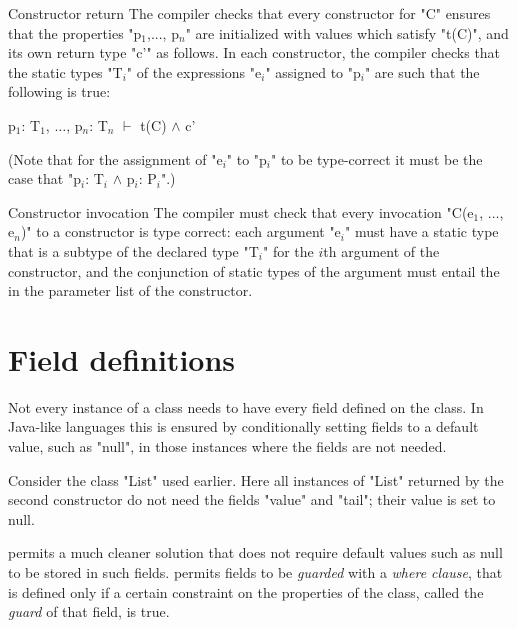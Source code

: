 \begin{staticrule}{Constructor return}
   The compiler checks that every constructor for \xcd"C" ensures that
   the properties \xcdmath"p$_1$,..., p$_n$" are initialized with values which satisfy
   \xcdmath"t(C)", and its own return type \xcd"c'" as follows.  In each constructor, the
   compiler checks that the static types \xcdmath"T$_i$" of the expressions \xcdmath"e$_i$"
   assigned to \xcdmath"p$_i$" are such that the following is
   true:
\begin{xtenmath}
p$_1$: T$_1$, $\dots$, p$_n$: T$_n$ $\vdash$ t(C) $\wedge$ c'     
\end{xtenmath}
\end{staticrule}
(Note that for the assignment of \xcdmath"e$_i$" to \xcdmath"p$_i$"
to be type-correct it must be the
    case that \xcdmath"p$_i$: T$_i$ $\wedge$ p$_i$: P$_i$".) 


\begin{staticrule}{Constructor invocation}
The compiler must check that every invocation \xcdmath"C(e$_1$, $\dots$, e$_n$)" to a
constructor is type correct: each argument \xcdmath"e$_i$" must have a static type
that is a subtype of the declared type \xcdmath"T$_i$" for the $i$th
argument of the
constructor, and the conjunction of static types of the argument must
entail the  in the parameter list of the constructor.
\end{staticrule}

\section{Field definitions}

Not every instance of a class needs to have every field defined on the
class. In Java-like languages this is ensured by conditionally setting
fields to a default value, such as \xcd"null", in those instances where the
fields are not needed.  

Consider the class \xcd"List" used earlier.  Here all instances of \xcd"List"
returned by the second constructor do not need the fields \xcd"value" and
\xcd"tail"; their value is set to null.

\label{FieldWhereClause}

\Xten{} permits a much cleaner solution that does not require default
values such as null to be stored in such fields. \Xten{} permits fields to
be {\em guarded} with a \emph{where clause}, that is defined only if a certain constraint on the
properties of the class, called the \emph{guard} of that field, is true.

